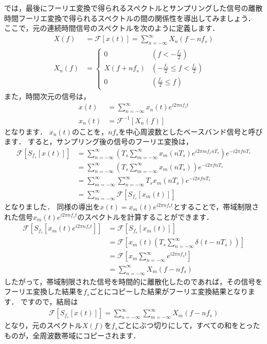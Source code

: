 では，最後にフーリエ変換で得られるスペクトルとサンプリングした信号の離散時間フーリエ変換で得られるスペクトルの間の関係性を導出してみましょう．
ここで，元の連続時間信号のスペクトルを次のように定義します．
\begin{align}
X(f) &= \mathcal{F}[x(t)] = \sum_{n=-\infty}^{\infty} X_n(f - nf_s) \\
X_n(f) &=   \begin{cases}
                0           & (f < -\frac{f_s}{2}) \\
                X(f + nf_s) & (-\frac{f_s}{2} \leq f < \frac{f_s}{2}) \\
                0           & (\frac{f_s}{2} \leq f)
            \end{cases}
\end{align}
また，時間次元の信号は，
\begin{align}
x(t) &= \sum_{n=-\infty}^{\infty} x_n(t) e^{i2\pi nf_s t} \\
x_n(t) &=   \mathcal{F}^{-1}[X_n(f)]
\end{align}
となります．
$x_n(t)$のことを，$nf_s$を中心周波数としたベースバンド信号と呼びます．
すると，サンプリング後の信号のフーリエ変換は，
\begin{align}
\mathcal{F}[S_{f_s}[x(t)]] &= \sum_{n=-\infty}^{\infty} \left(T_s \sum_{m=-\infty}^{\infty} x_m(nT_s) e^{i2\pi mf_s n T_s} \right) e^{-i2\pi fnT_s} \nonumber\\
    &= \sum_{n=-\infty}^{\infty} \left(T_s \sum_{m=-\infty}^{\infty} x_m(nT_s) \right) e^{-i2\pi fnT_s} \nonumber\\
    &= \sum_{m=-\infty}^{\infty} \sum_{n=-\infty}^{\infty} T_s x_m(nT_s) e^{-i2\pi fnT_s} \nonumber\\
    &= \sum_{m=-\infty}^{\infty} \mathcal{F}[S_{f_s}[x_m(t)]]
\end{align}
となりました．
同様の導出を$x(t)=x_m(t)e^{i2\pi nf_s t}$とすることで，帯域制限された信号$x_m(t)e^{i2\pi nf_s t}$のスペクトルを計算することができます．
\begin{align}
\mathcal{F}[S_{f_s}[x_m(t)e^{i2\pi nf_s t}]] &= \mathcal{F}[S_{f_s}[x_m(t)]] \nonumber\\
    &= \mathcal{F}\left[x_m(t) \left(T_s \sum_{n=-\infty}^{\infty} \delta(t - nT_s) \right) \right] \nonumber\\
    &= \mathcal{F}\left[x_m \sum_{n=-\infty}^{\infty} e^{i2\pi n f_s t} \right] \nonumber\\
    &= \sum_{n=-\infty}^{\infty} X_m(f - nf_s)
\end{align}
したがって，帯域制限された信号を時間的に離散化したのであれば，その信号をフーリエ変換した結果を$f_s$ごとにコピーした結果がフーリエ変換結果となります．
ですので，結局は
\begin{align}
\mathcal{F}[S_{f_s}[x(t)]] = \sum_{n=-\infty}^{\infty} \sum_{m=-\infty}^{\infty} X_m(f - nf_s) \label{eq:disc_time_freq}
\end{align}
となり，元のスペクトル$X(f)$を$f_s$ごとにぶつ切りにして，すべての和をとったものが，全周波数帯域にコピーされます．

